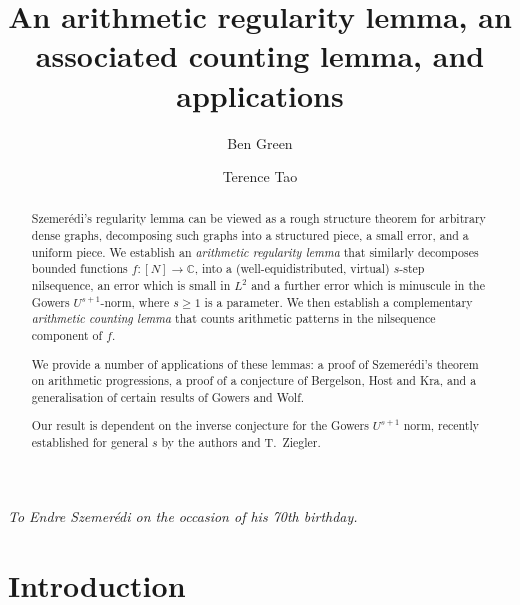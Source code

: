 \documentclass[11pt,reqno]{amsart}
\numberwithin{equation}{section}
\theoremstyle{plain}
\theoremstyle{definition}
\renewcommand{\geq}{\geqslant}
\newcommand\C{\mathbb{C}}
\newcommand\1{{\bf 1}}
\newcommand\2{{\bf 2}}
\begin{document}
\title[Arithmetic regularity and counting lemmas]{An arithmetic regularity lemma, an associated counting lemma, and applications}
\author{Ben Green}
\address{Centre for Mathematical Sciences\\
Wilberforce Road\\
Cambridge CB3 0WA\\
England }
\author{Terence Tao}
\address{Department of Mathematics\\
UCLA\\
Los Angeles, CA 90095\\
USA}

\subjclass{}

\begin{abstract} Szemer\'edi's regularity lemma can be viewed as a rough structure theorem for arbitrary dense graphs, decomposing such graphs into a structured piece, a small error, and a uniform piece. We establish an \emph{arithmetic regularity lemma} that similarly decomposes bounded functions $f : [N] \rightarrow \C$, into a (well-equidistributed, virtual) $s$-step nilsequence, an error which is small in $L^2$ and a further error which is minuscule in the Gowers $U^{s+1}$-norm, where $s \geq 1$ is a parameter. We then establish a complementary \emph{arithmetic counting lemma} that counts arithmetic patterns in the nilsequence component of $f$.

We provide a number of applications of these lemmas: a proof of Szemer\'edi's theorem on arithmetic progressions, a proof of a conjecture of Bergelson, Host and Kra, and a generalisation of certain results of Gowers and Wolf.

Our result is dependent on the inverse conjecture for the Gowers $U^{s+1}$ norm, recently established for general $s$ by the authors and T.~Ziegler.
\end{abstract}

\maketitle

\begin{center}
\emph{To Endre Szemer\'edi on the occasion of his 70th birthday.}
\end{center}

\tableofcontents

\setcounter{tocdepth}{1}

\section{Introduction}
\end{document}
